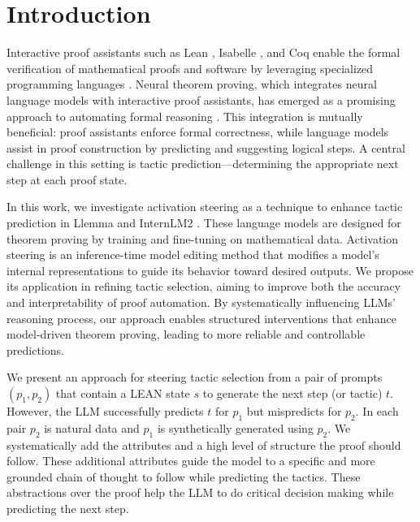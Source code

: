 \section{Introduction}
Interactive proof assistants such as Lean \cite{de2015lean}, Isabelle \cite{wenzel2008isabelle}, and Coq \cite{coq} enable the formal verification of mathematical proofs and software by leveraging specialized programming languages \cite{Avigad,Ringer2019}. Neural theorem proving, which integrates neural language models with interactive proof assistants, has emerged as a promising approach to automating formal reasoning \cite{baldur,polu2020generative,polu2022formal,yang2023leandojo,ntptutorial}. This integration is mutually beneficial: proof assistants enforce formal correctness, while language models assist in proof construction by predicting and suggesting logical steps. A central challenge in this setting is tactic prediction—determining the appropriate next step at each proof state.

In this work, we investigate activation steering \cite{panickssery2024steeringllama2contrastive, turner2024steeringlanguagemodelsactivation, lucchetti2024understandingcodellmsmispredicttypes} as a technique to enhance tactic prediction in Llemma \cite{azerbayev2024llemmaopenlanguagemodel} and InternLM2 \cite{ying2024internlmmathopenmathlarge}. These language models  are designed for theorem proving by training and fine-tuning on mathematical data. Activation steering is an inference-time model editing method that modifies a model’s internal representations to guide its behavior toward desired outputs. We propose its application in refining tactic selection, aiming to improve both the accuracy and interpretability of proof automation. By systematically influencing LLMs' reasoning process, our approach enables structured interventions that enhance model-driven theorem proving, leading to more reliable and controllable predictions.

We present an approach for steering tactic selection from a pair of prompts $(p_{1}, p_{2})$ that contain a LEAN state $s$ to generate the next step (or tactic) $t$. However, the LLM successfully predicts $t$ for $p_{1}$ but mispredicts for $p_{2}$.
In each pair $p_{2}$ is natural data and $p_{1}$ is synthetically generated using $p_{2}$. We systematically add the attributes and a high level of structure the proof should follow. These additional attributes guide the model to a specific and more grounded chain of thought to follow while predicting the tactics. These abstractions over the proof help the LLM to do critical decision making while predicting the next step. 
